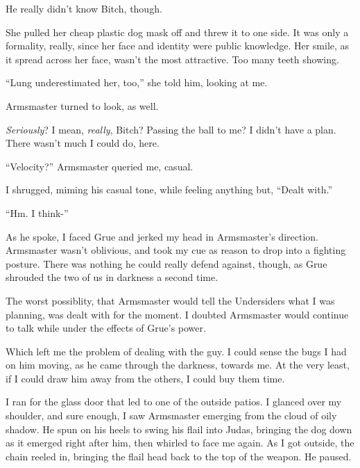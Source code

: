 He really didn't know Bitch, though.



She pulled her cheap plastic dog mask off and threw it to one side.  It was only a formality, really, since her face and identity were public knowledge.  Her smile, as it spread across her face, wasn't the most attractive.  Too many teeth showing.



``Lung underestimated her, too,'' she told him, looking at me.



Armsmaster turned to look, as well.



\emph{Seriously}?  I mean, \emph{really}, Bitch?  Passing the ball to me?  I didn't have a plan.  There wasn't much I could do, here.



``Velocity?''  Armsmaster queried me, casual.



I shrugged, miming his casual tone, while feeling anything but, ``Dealt with.''



``Hm.  I think-''



As he spoke, I faced Grue and jerked my head in Armsmaster's direction.  Armsmaster wasn't oblivious, and took my cue as reason to drop into a fighting posture.  There was nothing he could really defend against, though, as Grue shrouded the two of us in darkness a second time.



The worst possiblity, that Armsmaster would tell the Undersiders what I was planning, was dealt with for the moment.  I doubted Armsmaster would continue to talk while under the effects of Grue's power.



Which left me the problem of dealing with the guy.  I could sense the bugs I had on him moving, as he came through the darkness, towards me.  At the very least, if I could draw him away from the others, I could buy them time.



I ran for the glass door that led to one of the outside patios.  I glanced over my shoulder, and sure enough, I saw Armsmaster emerging from the cloud of oily shadow.  He spun on his heels to swing his flail into Judas, bringing the dog down as it emerged right after him, then whirled to face me again.  As I got outside, the chain reeled in, bringing the flail head back to the top of the weapon.  He paused.



